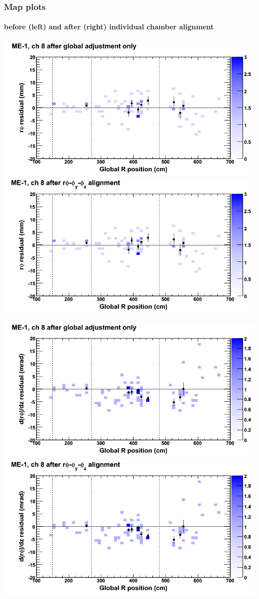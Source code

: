 \documentclass[compress]{beamer}
\begin{document}
\begin{frame}
\frametitle{Map plots}
\framesubtitle{before (left) and after (right) individual chamber alignment}
\includegraphics[width=0.5\linewidth]{ringmapplots_3dof/before_CSCvsr_mem1ch08_x.png} \includegraphics[width=0.5\linewidth]{ringmapplots_3dof/after_CSCvsr_mem1ch08_x.png}

\includegraphics[width=0.5\linewidth]{ringmapplots_3dof/before_CSCvsr_mem1ch08_dxdz.png} \includegraphics[width=0.5\linewidth]{ringmapplots_3dof/after_CSCvsr_mem1ch08_dxdz.png}
\end{frame}
\end{document}
